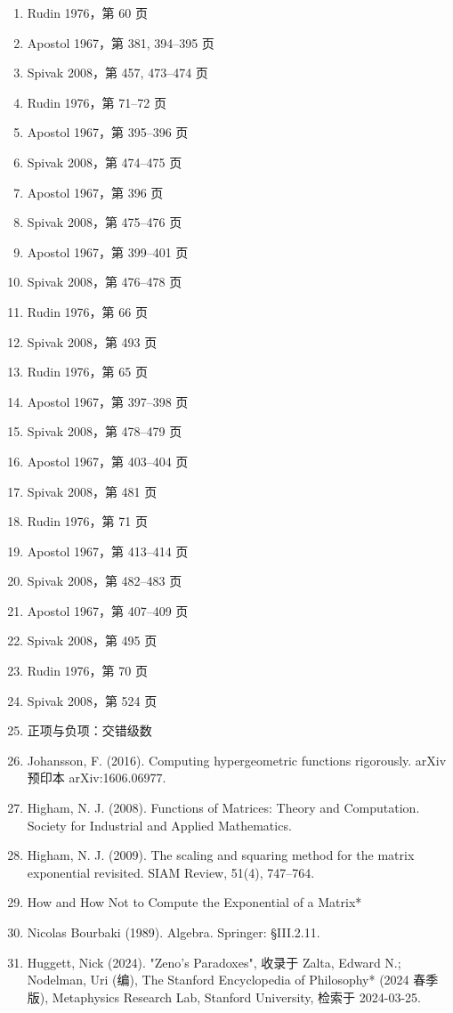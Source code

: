 \begin{enumerate}
\item Rudin 1976，第 60 页
\item Apostol 1967，第 381, 394–395 页
\item Spivak 2008，第 457, 473–474 页
\item Rudin 1976，第 71–72 页
\item Apostol 1967，第 395–396 页
\item Spivak 2008，第 474–475 页
\item Apostol 1967，第 396 页
\item Spivak 2008，第 475–476 页
\item Apostol 1967，第 399–401 页
\item Spivak 2008，第 476–478 页
\item Rudin 1976，第 66 页
\item Spivak 2008，第 493 页
\item Rudin 1976，第 65 页
\item Apostol 1967，第 397–398 页
\item Spivak 2008，第 478–479 页
\item Apostol 1967，第 403–404 页
\item Spivak 2008，第 481 页
\item Rudin 1976，第 71 页
\item Apostol 1967，第 413–414 页
\item Spivak 2008，第 482–483 页
\item Apostol 1967，第 407–409 页
\item Spivak 2008，第 495 页
\item Rudin 1976，第 70 页
\item Spivak 2008，第 524 页
\item 正项与负项：交错级数
\item Johansson, F. (2016). Computing hypergeometric functions rigorously. arXiv 预印本 arXiv:1606.06977.
\item Higham, N. J. (2008). Functions of Matrices: Theory and Computation. Society for Industrial and Applied Mathematics.
\item Higham, N. J. (2009). The scaling and squaring method for the matrix exponential revisited. SIAM Review, 51(4), 747–764.
\item How and How Not to Compute the Exponential of a Matrix*
\item Nicolas Bourbaki (1989). Algebra. Springer: §III.2.11.
\item Huggett, Nick (2024). "Zeno's Paradoxes", 收录于 Zalta, Edward N.; Nodelman, Uri (编), The Stanford Encyclopedia of Philosophy* (2024 春季版), Metaphysics Research Lab, Stanford University, 检索于 2024-03-25.

\end{enumerate}
